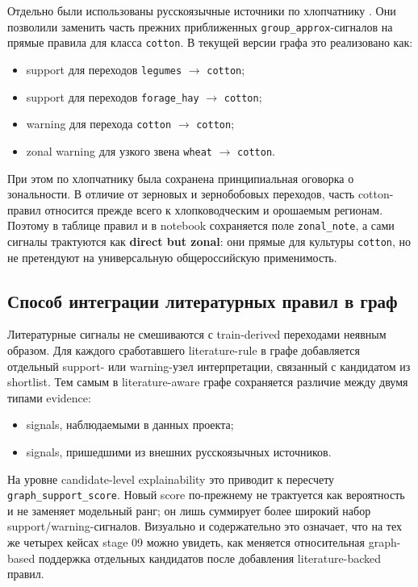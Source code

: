 Отдельно были использованы русскоязычные источники по хлопчатнику \cite{cotton-irrigated-technology,cotton-repeat-crop-study,cotton-pest-uzbekistan}. Они позволили заменить часть прежних приближенных \texttt{group\_approx}-сигналов на прямые правила для класса \texttt{cotton}. В текущей версии графа это реализовано как:

\begin{itemize}
\tightlist
\item
  support для переходов \texttt{legumes} $\rightarrow$ \texttt{cotton};
\item
  support для переходов \texttt{forage\_hay} $\rightarrow$ \texttt{cotton};
\item
  warning для перехода \texttt{cotton} $\rightarrow$ \texttt{cotton};
\item
  zonal warning для узкого звена \texttt{wheat} $\rightarrow$ \texttt{cotton}.
\end{itemize}

При этом по хлопчатнику была сохранена принципиальная оговорка о зональности. В отличие от зерновых и зернобобовых переходов, часть cotton-правил относится прежде всего к хлопководческим и орошаемым регионам. Поэтому в таблице правил и в notebook сохраняется поле \texttt{zonal\_note}, а сами сигналы трактуются как \textbf{direct but zonal}: они прямые для культуры \texttt{cotton}, но не претендуют на универсальную общероссийскую применимость.

\subsection{Способ интеграции литературных правил в граф}

Литературные сигналы не смешиваются с train-derived переходами неявным образом. Для каждого сработавшего literature-rule в графе добавляется отдельный support- или warning-узел интерпретации, связанный с кандидатом из shortlist. Тем самым в literature-aware графе сохраняется различие между двумя типами evidence:

\begin{itemize}
\tightlist
\item
  signals, наблюдаемыми в данных проекта;
\item
  signals, пришедшими из внешних русскоязычных источников.
\end{itemize}

На уровне candidate-level explainability это приводит к пересчету \texttt{graph\_support\_score}. Новый score по-прежнему не трактуется как вероятность и не заменяет модельный ранг; он лишь суммирует более широкий набор support/warning-сигналов. Визуально и содержательно это означает, что на тех же четырех кейсах stage 09 можно увидеть, как меняется относительная graph-based поддержка отдельных кандидатов после добавления literature-backed правил.

